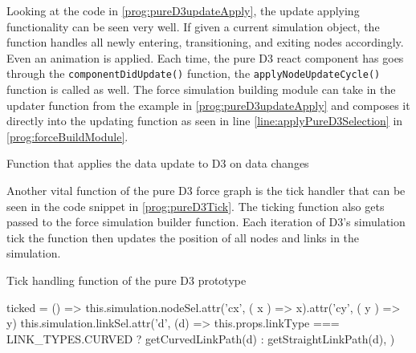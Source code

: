 Looking at the code in \ref{prog:pureD3updateApply}, the update applying functionality can be seen very well. If given a current simulation object, the function handles all newly entering, transitioning, and exiting nodes accordingly. Even an animation is applied. Each time, the pure D3 react component has goes through the \texttt{componentDidUpdate()} function, the \texttt{applyNodeUpdateCycle()} function is called as well. The force simulation building module can take in the updater function from the example in \ref{prog:pureD3updateApply} and composes it directly into the updating function as seen in line \ref{line:applyPureD3Selection} in \ref{prog:forceBuildModule}.

\begin{program}[th]
\caption{Function that applies the data update to D3 on data changes}
\label{prog:pureD3updateApply}
\end{program}

Another vital function of the pure D3 force graph is the tick handler that can be seen in the code snippet in \ref{prog:pureD3Tick}. The ticking function also gets passed to the force simulation builder function. Each iteration of D3's simulation tick the function then updates the position of all nodes and links in the simulation.

\begin{program}[th]
\caption{Tick handling function of the pure D3 prototype}
\label{prog:pureD3Tick}
\begin{JsCode}
ticked = () => {
  this.simulation.nodeSel.attr('cx', ({ x }) => x).attr('cy', ({ y }) => y)
  this.simulation.linkSel.attr('d', (d) =>
    this.props.linkType === LINK_TYPES.CURVED ? getCurvedLinkPath(d) : getStraightLinkPath(d),
  )
}
\end{JsCode}
\end{program}

